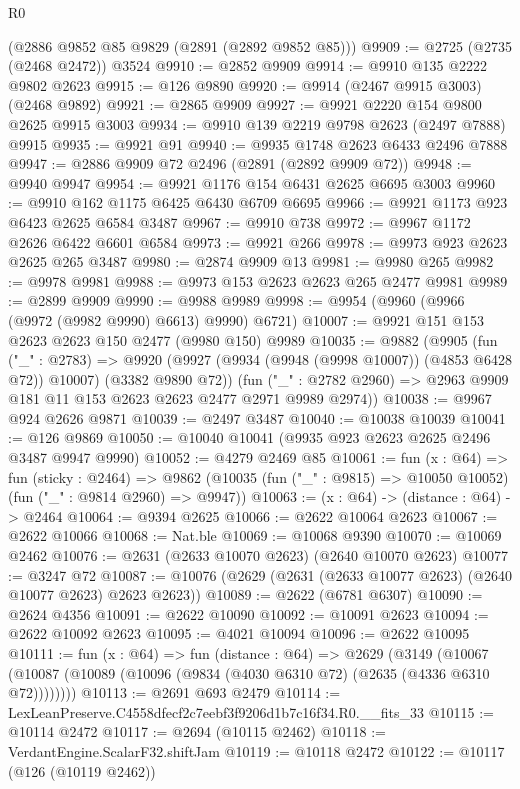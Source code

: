 \begin{lexlean}{R0}
\begin{coremodule}
    (@2886 @9852 @85 @9829 (@2891 (@2892 @9852 @85)))
@9909 := @2725 (@2735 (@2468 @2472)) @3524
@9910 := @2852 @9909
@9914 := @9910 @135 @2222 @9802 @2623
@9915 := @126 @9890
@9920 := @9914 (@2467 @9915 @3003) (@2468 @9892)
@9921 := @2865 @9909
@9927 := @9921 @2220 @154 @9800 @2625 @9915 @3003
@9934 := @9910 @139 @2219 @9798 @2623 (@2497 @7888) @9915
@9935 := @9921 @91
@9940 := @9935 @1748 @2623 @6433 @2496 @7888
@9947 := @2886 @9909 @72 @2496 (@2891 (@2892 @9909 @72))
@9948 := @9940 @9947
@9954 := @9921 @1176 @154 @6431 @2625 @6695 @3003
@9960 := @9910 @162 @1175 @6425 @6430 @6709 @6695
@9966 := @9921 @1173 @923 @6423 @2625 @6584 @3487
@9967 := @9910 @738
@9972 := @9967 @1172 @2626 @6422 @6601 @6584
@9973 := @9921 @266
@9978 := @9973 @923 @2623 @2625 @265 @3487
@9980 := @2874 @9909 @13
@9981 := @9980 @265
@9982 := @9978 @9981
@9988 := @9973 @153 @2623 @2623 @265 @2477 @9981
@9989 := @2899 @9909
@9990 := @9988 @9989
@9998 := @9954 (@9960 (@9966 (@9972 (@9982 @9990) @6613) @9990) @6721)
@10007 := @9921 @151 @153 @2623 @2623 @150 @2477 (@9980 @150) @9989
@10035 := @9882
    (@9905
      (fun ("_" : @2783) =>
      @9920 (@9927 (@9934 (@9948 (@9998 @10007)) (@4853 @6428 @72)) @10007) (@3382 @9890 @72))
      (fun ("_" : @2782 @2960) => @2963 @9909 @181 @11 @153 @2623 @2623 @2477 @2971 @9989 @2974))
@10038 := @9967 @924 @2626 @9871
@10039 := @2497 @3487
@10040 := @10038 @10039
@10041 := @126 @9869
@10050 := @10040 @10041 (@9935 @923 @2623 @2625 @2496 @3487 @9947 @9990)
@10052 := @4279 @2469 @85
@10061 := fun (x : @64) =>
  fun (sticky : @2464) =>
  @9862 (@10035 (fun ("_" : @9815) => @10050 @10052) (fun ("_" : @9814 @2960) => @9947))
@10063 := (x : @64) -> (distance : @64) -> @2464
@10064 := @9394 @2625
@10066 := @2622 @10064 @2623
@10067 := @2622 @10066
@10068 := Nat.ble
@10069 := @10068 @9390
@10070 := @10069 @2462
@10076 := @2631 (@2633 @10070 @2623) (@2640 @10070 @2623)
@10077 := @3247 @72
@10087 := @10076 (@2629 (@2631 (@2633 @10077 @2623) (@2640 @10077 @2623) @2623 @2623))
@10089 := @2622 (@6781 @6307)
@10090 := @2624 @4356
@10091 := @2622 @10090
@10092 := @10091 @2623
@10094 := @2622 @10092 @2623
@10095 := @4021 @10094
@10096 := @2622 @10095
@10111 := fun (x : @64) =>
  fun (distance : @64) =>
  @2629
    (@3149 (@10067 (@10087 (@10089 (@10096 (@9834 (@4030 @6310 @72) (@2635 (@4336 @6310 @72))))))))
@10113 := @2691 @693 @2479
@10114 := LexLeanPreserve.C4558dfecf2c7eebf3f9206d1b7c16f34.R0.__fits_33
@10115 := @10114 @2472
@10117 := @2694 (@10115 @2462)
@10118 := VerdantEngine.ScalarF32.shiftJam
@10119 := @10118 @2472
@10122 := @10117 (@126 (@10119 @2462))

\end{coremodule}
\end{lexlean}
